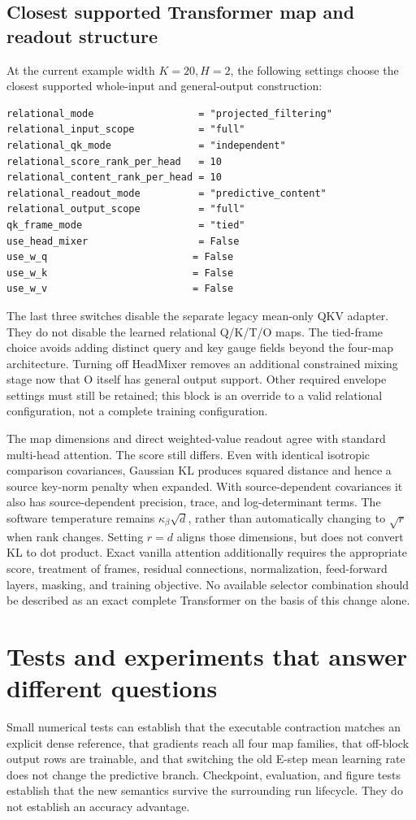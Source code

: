 \documentclass[11pt,letterpaper]{article}
\begin{document}
\subsection{Closest supported Transformer map and readout structure}
At the current example width $K=20,H=2$, the following settings choose the closest supported whole-input and general-output construction:
\begin{verbatim}
relational_mode                  = "projected_filtering"
relational_input_scope           = "full"
relational_qk_mode               = "independent"
relational_score_rank_per_head   = 10
relational_content_rank_per_head = 10
relational_readout_mode          = "predictive_content"
relational_output_scope          = "full"
qk_frame_mode                    = "tied"
use_head_mixer                   = False
use_w_q                         = False
use_w_k                         = False
use_w_v                         = False
\end{verbatim}
The last three switches disable the separate legacy mean-only QKV adapter. They do not disable the learned relational Q/K/T/O maps. The tied-frame choice avoids adding distinct query and key gauge fields beyond the four-map architecture. Turning off HeadMixer removes an additional constrained mixing stage now that O itself has general output support. Other required envelope settings must still be retained; this block is an override to a valid relational configuration, not a complete training configuration.

The map dimensions and direct weighted-value readout agree with standard multi-head attention. The score still differs. Even with identical isotropic comparison covariances, Gaussian KL produces squared distance and hence a source key-norm penalty when expanded. With source-dependent covariances it also has source-dependent precision, trace, and log-determinant terms. The software temperature remains $\kappa_\beta\sqrt d$, rather than automatically changing to $\sqrt r$ when rank changes. Setting $r=d$ aligns those dimensions, but does not convert KL to dot product. Exact vanilla attention additionally requires the appropriate score, treatment of frames, residual connections, normalization, feed-forward layers, masking, and training objective. No available selector combination should be described as an exact complete Transformer on the basis of this change alone.

\section{Tests and experiments that answer different questions}
Small numerical tests can establish that the executable contraction matches an explicit dense reference, that gradients reach all four map families, that off-block output rows are trainable, and that switching the old E-step mean learning rate does not change the predictive branch. Checkpoint, evaluation, and figure tests establish that the new semantics survive the surrounding run lifecycle. They do not establish an accuracy advantage.
\end{document}
